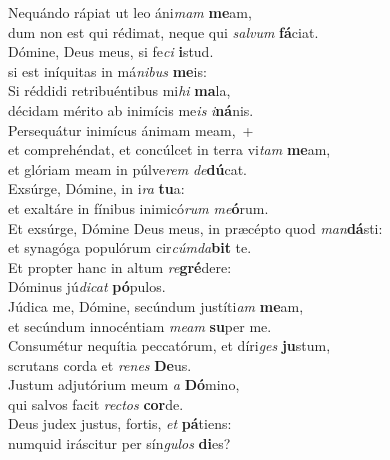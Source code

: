 \evenverse Nequándo rápiat ut leo áni\textit{mam} \textbf{me}am,~\*\\
\evenverse dum non est qui rédimat, neque qui \textit{sal}\textit{vum} \textbf{fá}ciat.\\
\oddverse Dómine, Deus meus, si fe\textit{ci} \textbf{i}stud.~\*\\
\oddverse si est iníquitas in má\textit{ni}\textit{bus} \textbf{me}is:\\
\evenverse Si réddidi retribuéntibus mi\textit{hi} \textbf{ma}la,~\*\\
\evenverse décidam mérito ab inimícis me\textit{is} \textit{i}\textbf{ná}nis.\\
\oddverse Persequátur inimícus ánimam meam,~+\\
\oddverse  et comprehéndat, et concúlcet in terra vi\textit{tam} \textbf{me}am,~\*\\
\oddverse et glóriam meam in púlve\textit{rem} \textit{de}\textbf{dú}cat.\\
\evenverse Exsúrge, Dómine, in i\textit{ra} \textbf{tu}a:~\*\\
\evenverse et exaltáre in fínibus inimicó\textit{rum} \textit{me}\textbf{ó}rum.\\
\oddverse Et exsúrge, Dómine Deus meus, in præcépto quod \textit{man}\textbf{dá}sti:~\*\\
\oddverse et synagóga populórum cir\textit{cúm}\textit{da}\textbf{bit} te.\\
\evenverse Et propter hanc in altum \textit{re}\textbf{gré}dere:~\*\\
\evenverse Dóminus jú\textit{di}\textit{cat} \textbf{pó}pulos.\\
\oddverse Júdica me, Dómine, secúndum justíti\textit{am} \textbf{me}am,~\*\\
\oddverse et secúndum innocéntiam \textit{me}\textit{am} \textbf{su}per me.\\
\evenverse Consumétur nequítia peccatórum, et díri\textit{ges} \textbf{ju}stum,~\*\\
\evenverse scrutans corda et \textit{re}\textit{nes} \textbf{De}us.\\
\oddverse Justum adjutórium meum \textit{a} \textbf{Dó}mino,~\*\\
\oddverse qui salvos facit \textit{re}\textit{ctos} \textbf{cor}de.\\
\evenverse Deus judex justus, fortis, \textit{et} \textbf{pá}tiens:~\*\\
\evenverse numquid iráscitur per sín\textit{gu}\textit{los} \textbf{di}es?\\
